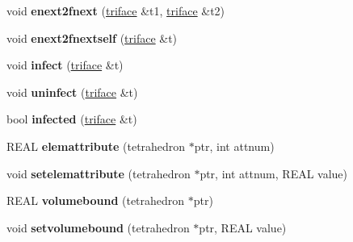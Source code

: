 \begin{DoxyCompactItemize}
\item 
\mbox{\label{classStemMesh3D_1_1tetgenmesh_ad04ba2e90cfc0064f9415d4b094f8ca4}} 
void {\bfseries enext2fnext} (\hyperlink{classStemMesh3D_1_1tetgenmesh_1_1triface}{triface} \&t1, \hyperlink{classStemMesh3D_1_1tetgenmesh_1_1triface}{triface} \&t2)
\item 
\mbox{\label{classStemMesh3D_1_1tetgenmesh_a34a06e6b0d4a93a1b3f54d75aa8cc033}} 
void {\bfseries enext2fnextself} (\hyperlink{classStemMesh3D_1_1tetgenmesh_1_1triface}{triface} \&t)
\item 
\mbox{\label{classStemMesh3D_1_1tetgenmesh_aeb796a6233ac4999cac53fc3930fbb31}} 
void {\bfseries infect} (\hyperlink{classStemMesh3D_1_1tetgenmesh_1_1triface}{triface} \&t)
\item 
\mbox{\label{classStemMesh3D_1_1tetgenmesh_aa1795afad705d59babceaf969de46273}} 
void {\bfseries uninfect} (\hyperlink{classStemMesh3D_1_1tetgenmesh_1_1triface}{triface} \&t)
\item 
\mbox{\label{classStemMesh3D_1_1tetgenmesh_a8898eaf29be7504819db306e70544715}} 
bool {\bfseries infected} (\hyperlink{classStemMesh3D_1_1tetgenmesh_1_1triface}{triface} \&t)
\item 
\mbox{\label{classStemMesh3D_1_1tetgenmesh_afceaa3afd1e4cbdd7c0a9c494e482645}} 
R\+E\+AL {\bfseries elemattribute} (tetrahedron $\ast$ptr, int attnum)
\item 
\mbox{\label{classStemMesh3D_1_1tetgenmesh_a5e7d2ede6146344b439f5d3b859c5610}} 
void {\bfseries setelemattribute} (tetrahedron $\ast$ptr, int attnum, R\+E\+AL value)
\item 
\mbox{\label{classStemMesh3D_1_1tetgenmesh_ac36b14063607bc1fb0f8fa5f08de60df}} 
R\+E\+AL {\bfseries volumebound} (tetrahedron $\ast$ptr)
\item 
\mbox{\label{classStemMesh3D_1_1tetgenmesh_a2fe5955c0d405a3e1fe39ae6f6da6512}} 
void {\bfseries setvolumebound} (tetrahedron $\ast$ptr, R\+E\+AL value)

\end{DoxyCompactItemize}

